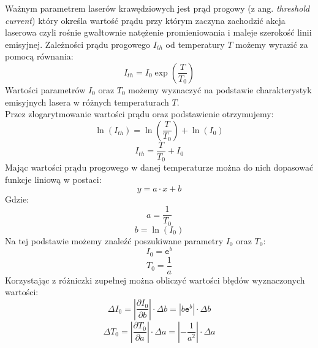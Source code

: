 \documentclass[a4paper, portrait,12pt]{report}
\begin{document}
Ważnym parametrem laserów krawędziowych jest prąd progowy (z ang. \textit{threshold
current}) który określa wartość prądu przy którym zaczyna zachodzić akcja laserowa czyli
rośnie gwałtownie natężenie promieniowania i maleje szerokość linii emisyjnej.
Zależności prądu progowego $I_{th}$ od temperatury $T$ możemy wyrazić za pomocą równania:
\begin{equation}
I_{th} = I_0 \exp \left( \frac{T}{T_0} \right)
\end{equation}
Wartości parametrów $I_0$ oraz $T_0$ możemy wyznaczyć na podstawie charakterystyk
emisyjnych lasera w różnych temperaturach $T$. \\
Przez zlogarytmowanie wartości prądu oraz podstawienie otrzymujemy:
\begin{equation}
\ln(I_{th}) =   \ln \left(\frac{T}{T_0} \right) + \ln(I_0)
\end{equation}
\begin{equation}
I_{th} = \frac{T}{T_0} + I_0
\end{equation}
Mając wartości prądu progowego w danej temperaturze  można do nich dopasować funkcje liniową w postaci:
\begin{equation}
y = a \cdot x + b
\end{equation}
Gdzie:
\begin{equation}
a = \frac{1}{T_0}
\end{equation}
\begin{equation}
b = \ln(I_0)
\end{equation}
Na tej podstawie możemy znaleźć poszukiwane parametry $I_0$ oraz $T_0$:
\begin{equation}
I_0 = \mathtt{e}^b
\end{equation}
\begin{equation}
T_0 = \frac{1}{a}
\end{equation}
Korzystając z różniczki zupełnej można obliczyć wartości błędów wyznaczonych wartości:
\begin{equation}
\Delta I_0 = \left\lvert \frac{\partial I_{0}}{\partial b} \right\rvert \cdot \Delta b = | b \mathtt{e}^b | \cdot \Delta b
\end{equation}
\begin{equation}
\Delta T_0 = \left\lvert \frac{\partial T_{0}}{\partial a} \right\rvert \cdot \Delta a = \left\lvert -\frac{1}{a^2} \right\rvert \cdot \Delta a
\end{equation}
%
\newpage
\end{document}
